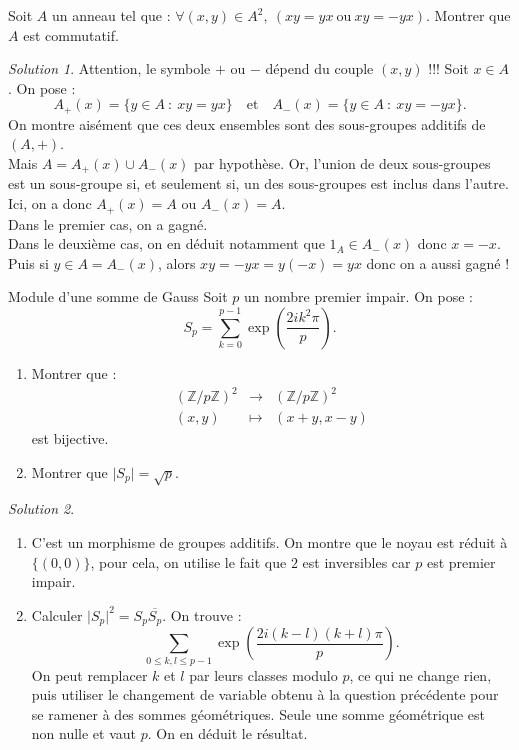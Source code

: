 \documentclass[french]{book}
\newcommand{\Z}{\mathbb{Z}}
\theoremstyle{definition}
\theoremstyle{remark}
\newtheorem*{sol}{Solution}
\begin{document}
\begin{exo}[2]{}
	Soit $A$ un anneau tel que : $\forall (x,y)\in A^2,\ (xy=yx\ \text{ou}\ xy=-yx)$. Montrer que $A$ est commutatif.
\end{exo}
\begin{sol}
	Attention, le symbole $+$ ou $-$ dépend du couple $(x,y)$ !!! Soit $x\in A$. On pose :
	$$A_+(x)=\{y\in A\ :\ xy=yx\}\quad\text{et}\quad A_-(x)=\{y\in A\ :\ xy=-yx\}.$$
	On montre aisément que ces deux ensembles sont des sous-groupes additifs de $(A,+)$.\\
	Mais $A=A_+(x)\cup A_-(x)$ par hypothèse. Or, l'union de deux sous-groupes est un sous-groupe si, et seulement si, un des sous-groupes est inclus dans l'autre. Ici, on a donc $A_+(x)=A$ ou $A_-(x)=A$.\\
	Dans le premier cas, on a gagné.\\
	Dans le deuxième cas, on en déduit notamment que $1_A\in A_-(x)$ donc $x=-x$. Puis si $y\in A=A_-(x)$, alors $xy=-yx=y(-x)=yx$ donc on a aussi gagné !
\end{sol}

\begin{exo}[2]{Module d'une somme de Gauss}
	Soit $p$ un nombre premier impair. On pose :
	$$S_p=\sum_{k=0}^{p-1}\exp\left(\frac{2i k^2\pi}{p}\right).$$
	\begin{enumerate}
		\item Montrer que :
		$$\begin{array}{rcl}
			(\Z/p\Z)^2&\longrightarrow&(\Z/p\Z)^2\\
			(x,y)&\longmapsto&(x+y,x-y)
		\end{array}$$ est bijective.
		\item Montrer que $\lvert S_p\rvert=\sqrt{p}$.
	\end{enumerate}
\end{exo}
\begin{sol}
	\begin{enumerate}
		\item C'est un morphisme de groupes additifs. On montre que le noyau est réduit à $\{(0,0)\}$, pour cela, on utilise le fait que $2$ est inversibles car $p$ est premier impair.
		\item Calculer $\lvert S_p\rvert^2=S_p\overline{S_p}$. On trouve :
		$$\sum_{0\leqslant k,l\leqslant p-1}\exp\left(\frac{2i(k-l)(k+l)\pi}{p}\right).$$
		On peut remplacer $k$ et $l$ par leurs classes modulo $p$, ce qui ne change rien, puis utiliser le changement de variable obtenu à la question précédente pour se ramener à des sommes géométriques. Seule une somme géométrique est non nulle et vaut $p$. On en déduit le résultat.
	\end{enumerate}
\end{sol}
\end{document}

